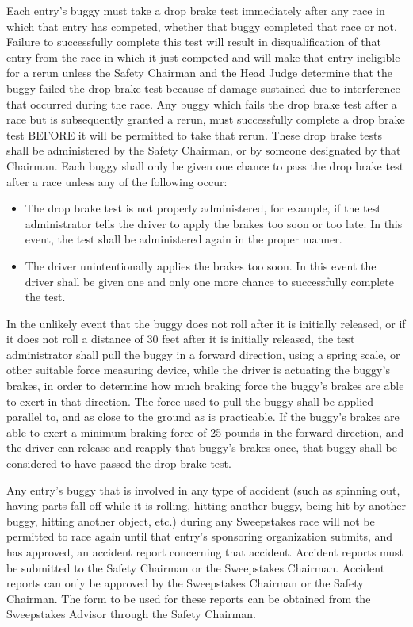 	Each entry's buggy must take a drop brake test immediately after any race in which that entry has competed, whether that buggy completed that race or not. Failure to successfully complete this test will result in disqualification of that entry from the race in which it just competed and will make that entry ineligible for a rerun unless the Safety Chairman and the Head Judge determine that the buggy failed the drop brake test because of damage sustained due to interference that occurred during the race. Any buggy which fails the drop brake test after a race but is subsequently granted a rerun, must successfully complete a drop brake test BEFORE it will be permitted to take that rerun. These drop brake tests shall be administered by the Safety Chairman, or by someone designated by that Chairman. Each buggy shall only be given one chance to pass the drop brake test after a race unless any of the following occur:

	\begin{itemize}

		\item
		The drop brake test is not properly administered, for example, if the test administrator tells the driver to apply the brakes too soon or too late. In this event, the test shall be administered again in the proper manner.

		\item
		The driver unintentionally applies the brakes too soon. In this event the driver shall be given one and only one more chance to successfully complete the test.

	\end{itemize}

	In the unlikely event that the buggy does not roll after it is initially released, or if it does not roll a distance of 30 feet after it is initially released, the test administrator shall pull the buggy in a forward direction, using a spring scale, or other suitable force measuring device, while the driver is actuating the buggy's brakes, in order to determine how much braking force the buggy's brakes are able to exert in that direction. The force used to pull the buggy shall be applied parallel to, and as close to the ground as is practicable. If the buggy's brakes are able to exert a minimum braking force of 25 pounds in the forward direction, and the driver can release and reapply that buggy's brakes once, that buggy shall be considered to have passed the drop brake test.

	Any entry's buggy that is involved in any type of accident (such as spinning out, having parts fall off while it is rolling, hitting another buggy, being hit by another buggy, hitting another object, etc.) during any Sweepstakes race will not be permitted to race again until that entry's sponsoring organization submits, and has approved, an accident report concerning that accident. Accident reports must be submitted to the Safety Chairman or the Sweepstakes Chairman. Accident reports can only be approved by the Sweepstakes Chairman or the Safety Chairman. The form to be used for these reports can be obtained from the Sweepstakes Advisor through the Safety Chairman.

